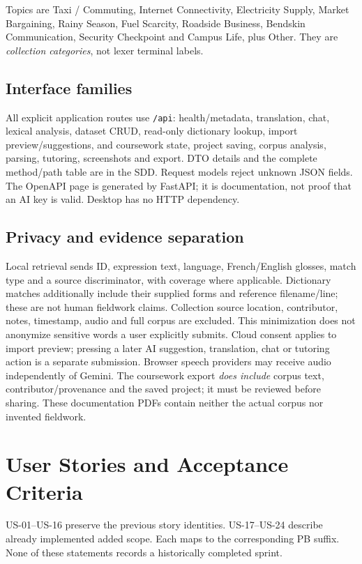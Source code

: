 \documentclass[11pt,a4paper]{article}
\begin{document}
Topics are Taxi / Commuting, Internet Connectivity, Electricity Supply,
Market Bargaining, Rainy Season, Fuel Scarcity, Roadside Business,
Bendskin Communication, Security Checkpoint and Campus Life, plus Other.
They are \emph{collection categories}, not lexer terminal labels.

\subsection{Interface families}
All explicit application routes use \nolinkurl{/api}: health/metadata,
translation, chat, lexical analysis, dataset CRUD, read-only dictionary lookup, import preview/suggestions,
and coursework state, project saving, corpus analysis, parsing, tutoring,
screenshots and export. DTO details and the
complete method/path table are in the SDD. Request models reject unknown
JSON fields. The OpenAPI page is generated by FastAPI; it is documentation,
not proof that an AI key is valid. Desktop has no HTTP dependency.

\subsection{Privacy and evidence separation}
Local retrieval sends ID, expression text, language, French/English
glosses, match type and a source discriminator, with coverage where applicable.
Dictionary matches additionally include their supplied forms and reference
filename/line; these are not human fieldwork claims. Collection source location,
contributor, notes, timestamp, audio and full corpus are excluded. This
minimization does not anonymize sensitive words a user explicitly submits.
Cloud consent applies to import preview; pressing a later AI suggestion,
translation, chat or tutoring action is a separate submission. Browser speech
providers may receive audio independently of Gemini. The coursework export
\emph{does include} corpus text, contributor/provenance and the saved project;
it must be reviewed before sharing. These documentation PDFs contain neither
the actual corpus nor invented fieldwork.

\section{User Stories and Acceptance Criteria}
US-01--US-16 preserve the previous story identities. US-17--US-24 describe
already implemented added scope. Each maps to the corresponding PB suffix.
None of these statements records a historically completed sprint.
\end{document}
